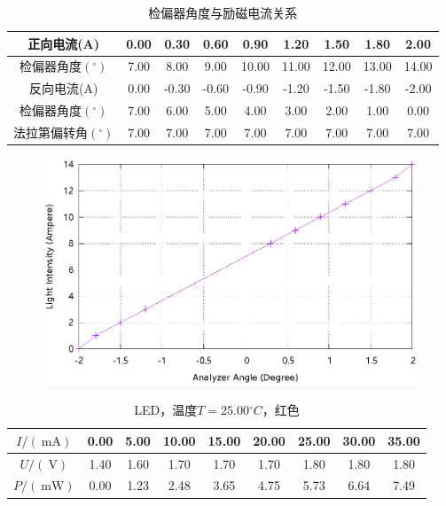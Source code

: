 \documentclass{ctexart}
\newcommand{\si}[1]{\  \mathrm{#1}}
\begin{document}
\begin{table}[H]
    \centering
    \begin{tabular}{|c|c|c|c|c|c|c|c|c|}
        \hline
        正向电流(A)  & 0.00 & 0.30 & 0.60 & 0.90 & 1.20 & 1.50  & 1.80  & 2.00 \\\hline
        检偏器角度$({}^{\circ})$ & 7.00 & 8.00 & 9.00 & 10.00 & 11.00 & 12.00 & 13.00 & 14.00 \\\hline
        反向电流(A)  & 0.00  & -0.30 & -0.60 & -0.90 & -1.20 & -1.50 & -1.80 & -2.00 \\\hline
        检偏器角度$({}^{\circ})$ & 7.00 & 6.00 & 5.00 & 4.00 & 3.00 & 2.00 & 1.00 & 0.00 \\\hline
        法拉第偏转角$({}^{\circ})$ & 7.00 & 7.00 & 7.00 & 7.00 & 7.00 & 7.00 & 7.00 & 7.00 \\\hline
    \end{tabular}
    \caption{检偏器角度与励磁电流关系}
\end{table}
\begin{figure}[H]
    \centering
    \includegraphics[width=0.9\linewidth]{../output/light-intensity-analyzer-angle.gnuplot}
\end{figure}
\newpage
\begin{table}[H]
    \centering
    \begin{tabular}{|c|c|c|c|c|c|c|c|c|}
        \hline
        $I/(\si{mA})$ & 0.00 & 5.00 & 10.00 & 15.00 & 20.00 & 25.00 & 30.00 & 35.00 \\\hline
        $U / (\si{V})$  & 1.40 & 1.60 & 1.70 & 1.70 & 1.70 & 1.80 & 1.80 & 1.80 \\\hline
        $P / (\si{mW})$ & 0.00 & 1.23 & 2.48 & 3.65 & 4.75 & 5.73 & 6.64 & 7.49 \\\hline
    \end{tabular}
    \caption{LED，温度$T=25.00{}^{\circ}C$，红色}
\end{table}
\end{document}
